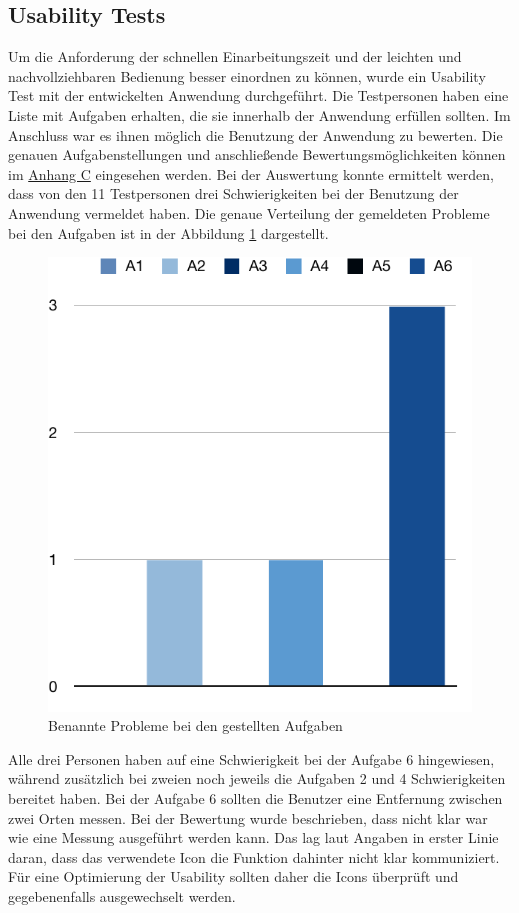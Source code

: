 \subsection{Usability Tests}
Um die Anforderung der schnellen Einarbeitungszeit und der leichten und nachvollziehbaren Bedienung besser einordnen zu können, wurde ein Usability Test mit der entwickelten Anwendung durchgeführt.
Die Testpersonen haben eine Liste mit Aufgaben erhalten, die sie innerhalb der Anwendung erfüllen sollten.
Im Anschluss war es ihnen möglich die Benutzung der Anwendung zu bewerten.
Die genauen Aufgabenstellungen und anschließende Bewertungsmöglichkeiten können im \hyperref[sec:appendixc]{Anhang C} eingesehen werden.\pbreak%
%
Bei der Auswertung konnte ermittelt werden, dass von den 11 Testpersonen drei Schwierigkeiten bei der Benutzung der Anwendung vermeldet haben.
Die genaue Verteilung der gemeldeten Probleme bei den Aufgaben ist in der Abbildung \ref{fig:usability-column} dargestellt.
\begin{figure}[h]
	\centering
	\vspace{15pt}
	\includegraphics[scale=0.8]{images/usability-results-column.pdf}
	\caption{Benannte Probleme bei den gestellten Aufgaben}
	\label{fig:usability-column}
\end{figure}
Alle drei Personen haben auf eine Schwierigkeit bei der Aufgabe 6 hingewiesen, während zusätzlich bei zweien noch jeweils die Aufgaben 2 und 4 Schwierigkeiten bereitet haben.
Bei der Aufgabe 6 sollten die Benutzer eine Entfernung zwischen zwei Orten messen.
Bei der Bewertung wurde beschrieben, dass nicht klar war wie eine Messung ausgeführt werden kann.
Das lag laut Angaben in erster Linie daran, dass das verwendete Icon die Funktion dahinter nicht klar kommuniziert.
Für eine Optimierung der Usability sollten daher die Icons überprüft und gegebenenfalls ausgewechselt werden.

